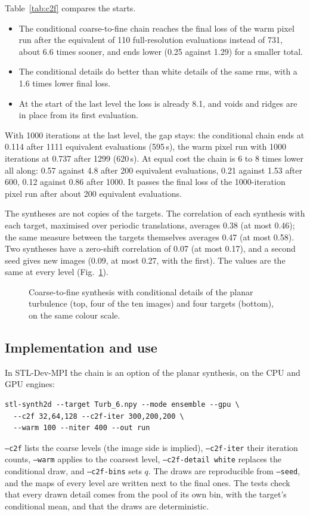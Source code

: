 Table~\ref{tab:c2f} compares the starts.
\begin{itemize}
\item The conditional coarse-to-fine chain reaches the final loss of the warm pixel run after the equivalent of 110 full-resolution evaluations instead of 731, about 6.6 times sooner, and ends lower (0.25 against 1.29) for a smaller total.
\item The conditional details do better than white details of the same rms, with a 1.6 times lower final loss.
\item At the start of the last level the loss is already 8.1, and voids and ridges are in place from its first evaluation.
\end{itemize}
With 1000 iterations at the last level, the gap stays: the conditional chain ends at 0.114 after 1111 equivalent evaluations (595\,s), the warm pixel run with 1000 iterations at 0.737 after 1299 (620\,s). At equal cost the chain is 6 to 8 times lower all along: 0.57 against 4.8 after 200 equivalent evaluations, 0.21 against 1.53 after 600, 0.12 against 0.86 after 1000. It passes the final loss of the 1000-iteration pixel run after about 200 equivalent evaluations.

The syntheses are not copies of the targets. The correlation of each synthesis with each target, maximised over periodic translations, averages 0.38 (at most 0.46); the same measure between the targets themselves averages 0.47 (at most 0.58). Two syntheses have a zero-shift correlation of 0.07 (at most 0.17), and a second seed gives new images (0.09, at most 0.27, with the first). The values are the same at every level (Fig.~\ref{fig:c2f}).

\begin{figure}
\centering
{}
\caption{Coarse-to-fine synthesis with conditional details of the planar turbulence (top, four of the ten images) and four targets (bottom), on the same colour scale.}
\label{fig:c2f}
\end{figure}

\subsection{Implementation and use}

In STL-Dev-MPI the chain is an option of the planar synthesis, on the CPU and GPU engines:
\begin{verbatim}
stl-synth2d --target Turb_6.npy --mode ensemble --gpu \
  --c2f 32,64,128 --c2f-iter 300,200,200 \
  --warm 100 --niter 400 --out run
\end{verbatim}
\texttt{--c2f} lists the coarse levels (the image side is implied), \texttt{--c2f-iter} their iteration counts, \texttt{--warm} applies to the coarsest level, \texttt{--c2f-detail white} replaces the conditional draw, and \texttt{--c2f-bins} sets $q$. The draws are reproducible from \texttt{--seed}, and the maps of every level are written next to the final ones. The tests check that every drawn detail comes from the pool of its own bin, with the target's conditional mean, and that the draws are deterministic.

